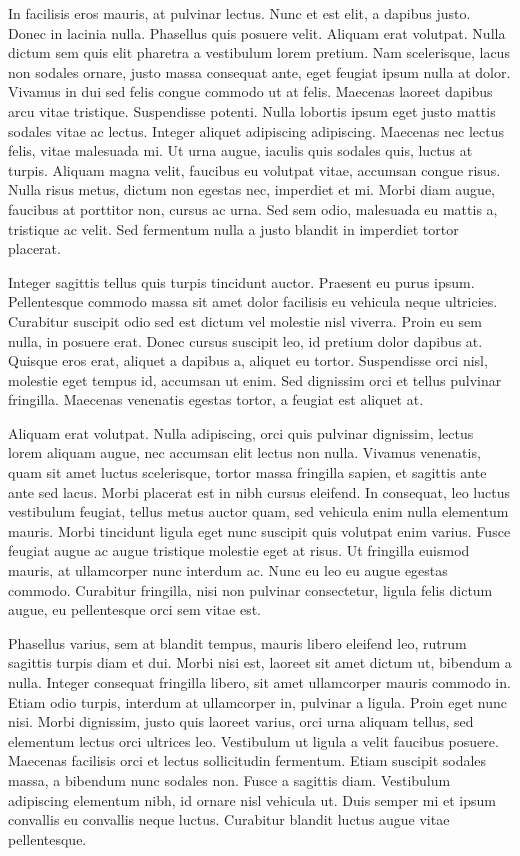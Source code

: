 \documentclass{ritsi/article}
\begin{document}
In facilisis eros mauris, at pulvinar lectus. Nunc et est elit, a dapibus justo. Donec in lacinia nulla. Phasellus quis posuere velit. Aliquam erat volutpat. Nulla dictum sem quis elit pharetra a vestibulum lorem pretium. Nam scelerisque, lacus non sodales ornare, justo massa consequat ante, eget feugiat ipsum nulla at dolor. Vivamus in dui sed felis congue commodo ut at felis. Maecenas laoreet dapibus arcu vitae tristique. 
Suspendisse potenti. Nulla lobortis ipsum eget justo mattis sodales vitae ac lectus. Integer aliquet adipiscing adipiscing. Maecenas nec lectus felis, vitae malesuada mi. Ut urna augue, iaculis quis sodales quis, luctus at turpis. Aliquam magna velit, faucibus eu volutpat vitae, accumsan congue risus. Nulla risus metus, dictum non egestas nec, imperdiet et mi. Morbi diam augue, faucibus at porttitor non, cursus ac urna. Sed sem odio, malesuada eu mattis a, tristique ac velit. Sed fermentum nulla a justo blandit in imperdiet tortor placerat.

Integer sagittis tellus quis turpis tincidunt auctor. Praesent eu purus ipsum. Pellentesque commodo massa sit amet dolor facilisis eu vehicula neque ultricies. Curabitur suscipit odio sed est dictum vel molestie nisl viverra. Proin eu sem nulla, in posuere erat. Donec cursus suscipit leo, id pretium dolor dapibus at. Quisque eros erat, aliquet a dapibus a, aliquet eu tortor. Suspendisse orci nisl, molestie eget tempus id, accumsan ut enim. Sed dignissim orci et tellus pulvinar fringilla. Maecenas venenatis egestas tortor, a feugiat est aliquet at.

Aliquam erat volutpat. Nulla adipiscing, orci quis pulvinar dignissim, lectus lorem aliquam augue, nec accumsan elit lectus non nulla. Vivamus venenatis, quam sit amet luctus scelerisque, tortor massa fringilla sapien, et sagittis ante ante sed lacus. Morbi placerat est in nibh cursus eleifend. In consequat, leo luctus vestibulum feugiat, tellus metus auctor quam, sed vehicula enim nulla elementum mauris. Morbi tincidunt ligula eget nunc suscipit quis volutpat enim varius. Fusce feugiat augue ac augue tristique molestie eget at risus. Ut fringilla euismod mauris, at ullamcorper nunc interdum ac. Nunc eu leo eu augue egestas commodo. Curabitur fringilla, nisi non pulvinar consectetur, ligula felis dictum augue, eu pellentesque orci sem vitae est.

Phasellus varius, sem at blandit tempus, mauris libero eleifend leo, rutrum sagittis turpis diam et dui. Morbi nisi est, laoreet sit amet dictum ut, bibendum a nulla. Integer consequat fringilla libero, sit amet ullamcorper mauris commodo in. Etiam odio turpis, interdum at ullamcorper in, pulvinar a ligula. Proin eget nunc nisi. Morbi dignissim, justo quis laoreet varius, orci urna aliquam tellus, sed elementum lectus orci ultrices leo. Vestibulum ut ligula a velit faucibus posuere. Maecenas facilisis orci et lectus sollicitudin fermentum. Etiam suscipit sodales massa, a bibendum nunc sodales non. Fusce a sagittis diam. Vestibulum adipiscing elementum nibh, id ornare nisl vehicula ut. Duis semper mi et ipsum convallis eu convallis neque luctus. Curabitur blandit luctus augue vitae pellentesque.
\end{document}
